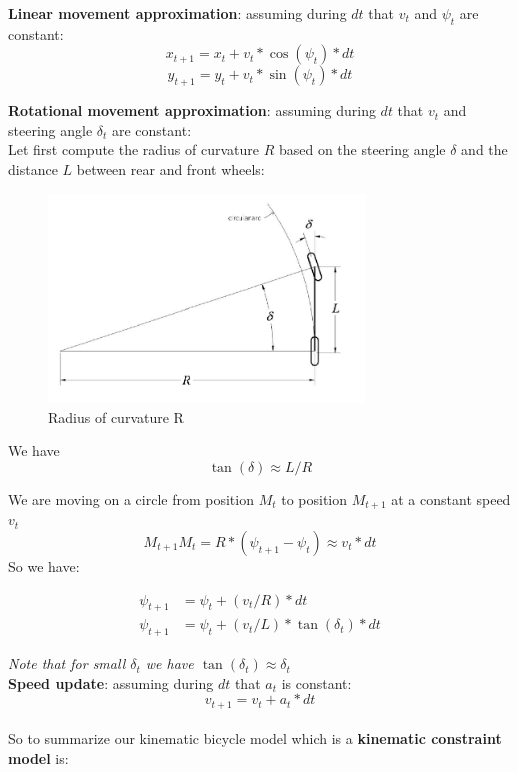 \documentclass[11pt]{article}
\begin{document}
\textbf{Linear movement approximation}: assuming during $dt$ that $v_t$ and $\psi_t$ are constant:
$$ x_{t+1} = x_t + v_t * \cos(\psi_t) *  dt $$
$$ y_{t+1} = y_t + v_t * \sin(\psi_t) *  dt $$

\textbf{Rotational movement approximation}: assuming during $dt$ that $v_t$ and steering angle $\delta_t$ are constant: \\

Let first compute the radius of curvature $R$ based on the steering angle $\delta$ and the distance $L$ between rear and front wheels:

\begin{figure}[h]
    \centering
    \includegraphics[width=0.75\textwidth]{radius_curvature}
    \caption{Radius of curvature R}
    \label{fig:radius_curvature}
\end{figure}
\FloatBarrier

We have $$ \tan(\delta) \approx L /R $$

We are moving on a circle from position $M_t$ to position $M_{t+1}$ at a constant speed $v_t$
$$ {M_{t+1}M_{t}} = R * (\psi_{t+1} - \psi_t) \approx v_t * dt$$ 
So we have:

\begin{align*} 
\psi_{t+1} &= \psi_t + (v_t / R) * dt \\
\psi_{t+1} &= \psi_t + (v_t / L) * \tan(\delta_t) * dt
\end{align*} 

\textit{Note that for small $\delta_t$ we have $\tan(\delta_t) \approx \delta_t$} \\

\textbf{Speed update}: assuming during $dt$ that $a_t$ is constant:
$$ v_{t+1} = v_t + a_t * dt $$ \\

So to summarize our kinematic bicycle model which is a \textbf{kinematic constraint model} is:
\end{document}
